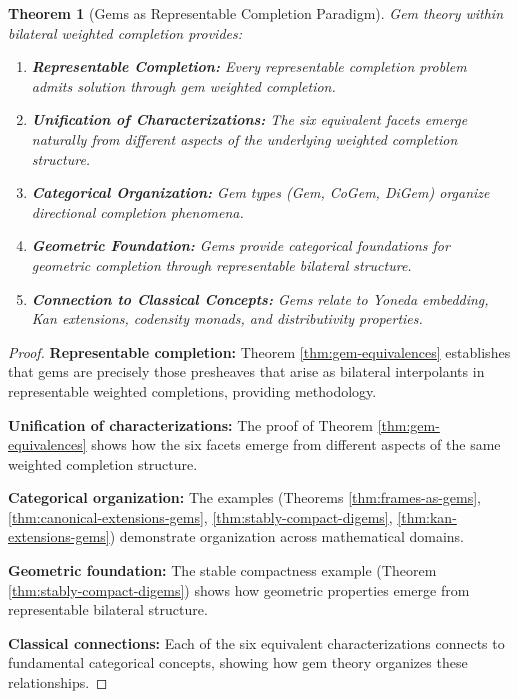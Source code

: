\documentclass[11pt]{article}
\theoremstyle{plain}
\newtheorem{theorem}{Theorem}[section]
\theoremstyle{definition}
\theoremstyle{remark}
\begin{document}
\begin{theorem}[Gems as Representable Completion Paradigm]\label{thm:gem-paradigm}
Gem theory within bilateral weighted completion provides:

\begin{enumerate}
\item \textbf{Representable Completion:} Every representable completion problem admits solution through gem weighted completion.

\item \textbf{Unification of Characterizations:} The six equivalent facets emerge naturally from different aspects of the underlying weighted completion structure.

\item \textbf{Categorical Organization:} Gem types (Gem, CoGem, DiGem) organize directional completion phenomena.

\item \textbf{Geometric Foundation:} Gems provide categorical foundations for geometric completion through representable bilateral structure.

\item \textbf{Connection to Classical Concepts:} Gems relate to Yoneda embedding, Kan extensions, codensity monads, and distributivity properties.
\end{enumerate}
\end{theorem}

\begin{proof}
\textbf{Representable completion:} Theorem \ref{thm:gem-equivalences} establishes that gems are precisely those presheaves that arise as bilateral interpolants in representable weighted completions, providing methodology.

\textbf{Unification of characterizations:} The proof of Theorem \ref{thm:gem-equivalences} shows how the six facets emerge from different aspects of the same weighted completion structure.

\textbf{Categorical organization:} The examples (Theorems \ref{thm:frames-as-gems}, \ref{thm:canonical-extensions-gems}, \ref{thm:stably-compact-digems}, \ref{thm:kan-extensions-gems}) demonstrate organization across mathematical domains.

\textbf{Geometric foundation:} The stable compactness example (Theorem \ref{thm:stably-compact-digems}) shows how geometric properties emerge from representable bilateral structure.

\textbf{Classical connections:} Each of the six equivalent characterizations connects to fundamental categorical concepts, showing how gem theory organizes these relationships.
\end{proof}
\end{document}
